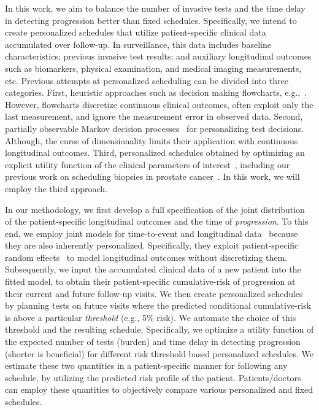 In this work, we aim to balance the number of invasive tests and the time delay in detecting progression better than fixed schedules. Specifically, we intend to create personalized schedules that utilize patient-specific clinical data accumulated over follow-up. In surveillance, this data includes baseline characteristics; previous invasive test results; and auxiliary longitudinal outcomes such as biomarkers, physical examination, and medical imaging measurements, etc. Previous attempts at personalized scheduling can be divided into three categories. First, heuristic approaches such as decision making flowcharts, e.g.,~\citet{bokhorst2015compliance}. However, flowcharts discretize continuous clinical outcomes, often exploit only the last measurement, and ignore the measurement error in observed data. Second, partially observable Markov decision processes~\citep{alagoz2010operations, steimle2017markov} for personalizing test decisions. Although, the curse of dimensionality limits their application with continuous longitudinal outcomes. Third, personalized schedules obtained by optimizing an explicit utility function of the clinical parameters of interest~\citep{bebu2017optimal,rizopoulos2015personalized}, including our previous work on scheduling biopsies in prostate cancer~\citep{tomer2019personalized}. In this work, we will employ the third approach.

In our methodology, we first develop a full specification of the joint distribution of the patient-specific longitudinal outcomes and the time of \textit{progression}. To this end, we employ joint models for time-to-event and longitudinal data~\citep{tsiatis2004joint,rizopoulos2012joint} because they are also inherently personalized. Specifically, they exploit patient-specific random effects~\citep{laird1982random} to model longitudinal outcomes without discretizing them. Subsequently, we input the accumulated clinical data of a new patient into the fitted model, to obtain their patient-specific cumulative-risk of progression at their current and future follow-up visits. We then create personalized schedules by planning tests on future visits where the predicted conditional cumulative-risk is above a particular \textit{threshold} (e.g., 5\% risk). We automate the choice of this threshold and the resulting schedule. Specifically, we optimize a utility function of the expected number of tests (burden) and time delay in detecting progression (shorter is beneficial) for different risk threshold based personalized schedules. We estimate these two quantities in a patient-specific manner for following any schedule, by utilizing the predicted risk profile of the patient. Patients/doctors can employ these quantities to objectively compare various personalized and fixed schedules.

